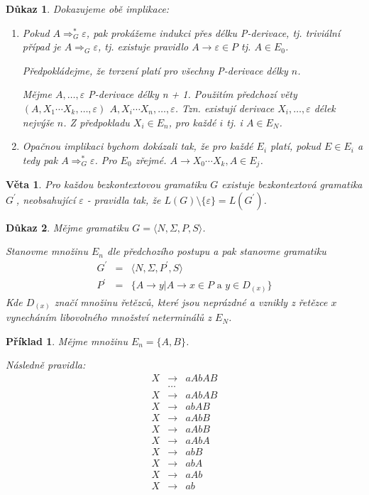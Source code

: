 \documentclass[10pt, a4paper, titlepage]{article}
\theoremstyle{note}
\newtheorem{dukaz}{Důkaz}
\newtheorem{veta}{Věta}
\newtheorem{priklad}{Příklad}
\begin{document}
\begin{dukaz}
Dokazujeme obě implikace:
\begin{enumerate}
\item
Pokud $A \Rightarrow_{G}^{*}\varepsilon$, pak prokážeme indukci přes délku P-derivace, tj. triviální případ je $A \Rightarrow_{G}\varepsilon$, 
tj. existuje pravidlo $A \rightarrow \varepsilon \in P$ tj. $A \in E_{0}$.

Předpokládejme, že tvrzení platí pro všechny P-derivace délky $n$.

Mějme $A, \ldots, \varepsilon$ P-derivace délky n + 1. Použitím předchozí věty $(A, X_{1} \cdots X_{k}, \ldots, \varepsilon)$ $A, X_{i} \cdots X_{n}, \ldots, \varepsilon$.
Tzn. existují derivace $X_{i}, \ldots, \varepsilon$ délek nejvýše $n$. Z předpokladu $X_{i} \in E_{n}$, pro každé $i$ tj. i $A \in E_{N}$. 

\item
Opačnou implikaci bychom dokázali tak, že pro každé $E_{i}$ platí, pokud $E \in E_{i}$ a tedy pak $A \Rightarrow_{G}^{*}\varepsilon$. Pro $E_{0}$ zřejmé.
$A \rightarrow X_{0} \cdots X_{k}, A \in E_{j}$.
\end{enumerate}
\end{dukaz}

\begin{veta}
Pro každou bezkontextovou gramatiku $G$ existuje bezkontextová gramatika $G^{'}$, neobsahující $\varepsilon$ - pravidla tak, že $L(G) \setminus \lbrace \varepsilon \rbrace = L(G^{'})$.
\end{veta}

\begin{dukaz}
Mějme gramatiku $G = \langle N, \Sigma, P,S \rangle$.

Stanovme množinu $E_{n}$ dle předchozího postupu a pak stanovme gramatiku
\begin{eqnarray*}
G^{'} &=& \langle N, \Sigma, P^{'},S \rangle \\
P^{'} &=& \lbrace A \rightarrow y|A \rightarrow x \in P \text{ a } y \in D_{(x)} \rbrace
\end{eqnarray*}
Kde $D_{(x)}$ značí množinu řetězců, které jsou neprázdné a vznikly z řetězce $x$ vynecháním
libovolného množství neterminálů z $E_{N}$.
\end{dukaz}

\begin{priklad}
Mějme množinu $E_{n} = \lbrace A, B \rbrace$.

Následně pravidla:
\begin{eqnarray*}
X &\rightarrow& aAbAB \\
&\ldots& \\
X &\rightarrow& aAbAB \\
X &\rightarrow& abAB \\
X &\rightarrow& aAbB \\
X &\rightarrow& aAbB \\
X &\rightarrow& aAbA \\
X &\rightarrow& abB \\
X &\rightarrow& abA \\
X &\rightarrow& aAb \\
X &\rightarrow& ab
\end{eqnarray*}
\end{priklad}
\end{document}
